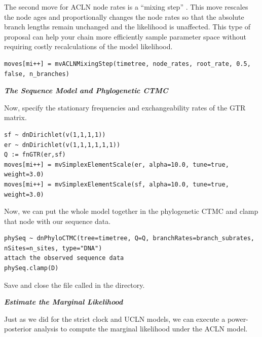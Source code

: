 The second move for ACLN node rates is a ``mixing step'' \citep{thorne98,kishino01,thorne02,rannala2003,yang06}.
This move rescales the node ages and proportionally changes the node rates so that the absolute branch lengths remain unchanged and the likelihood is unaffected.
This type of proposal can help your chain more efficiently sample parameter space without requiring costly recalculations of the model likelihood.
{\tt \begin{snugshade*}
\begin{lstlisting}
moves[mi++] = mvACLNMixingStep(timetree, node_rates, root_rate, 0.5, false, n_branches)
\end{lstlisting}
\end{snugshade*}}

\textbf{\textit{The Sequence Model and Phylogenetic CTMC}}

Now, specify the stationary frequencies and exchangeability rates of the GTR matrix.
{\tt \begin{snugshade*}
\begin{lstlisting}
sf ~ dnDirichlet(v(1,1,1,1))
er ~ dnDirichlet(v(1,1,1,1,1,1))
Q := fnGTR(er,sf)
moves[mi++] = mvSimplexElementScale(er, alpha=10.0, tune=true, weight=3.0)
moves[mi++] = mvSimplexElementScale(sf, alpha=10.0, tune=true, weight=3.0)
\end{lstlisting}
\end{snugshade*}}

Now, we can put the whole model together in the phylogenetic CTMC and clamp that node with our sequence data.
{\tt \begin{snugshade*}
\begin{lstlisting}
phySeq ~ dnPhyloCTMC(tree=timetree, Q=Q, branchRates=branch_subrates, nSites=n_sites, type="DNA")
attach the observed sequence data
phySeq.clamp(D)
\end{lstlisting}
\end{snugshade*}}

{\begin{framed}
Save and close the file called {\textcolor{red}{}} in the  directory.
\end{framed}}



\textbf{\textit{Estimate the Marginal Likelihood}}

Just as we did for the strict clock and UCLN models, we can execute a power-posterior analysis to compute the marginal likelihood under the ACLN model. 

